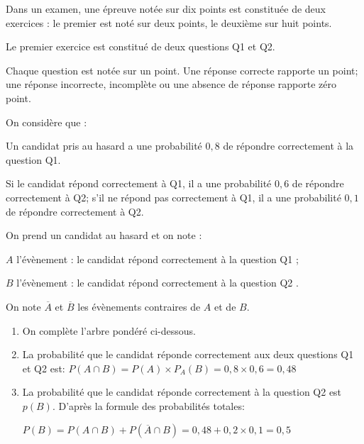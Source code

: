 
Dans un examen, une épreuve notée sur dix points est constituée de deux exercices : le premier est noté sur deux points, le deuxième sur huit points.


\medskip


\medskip




Le premier exercice est constitué de deux questions Q1 et Q2.

Chaque question est notée sur un point. Une réponse correcte rapporte un point; une réponse incorrecte, incomplète ou une absence de réponse rapporte zéro point.

\begin{list}{\textbullet}{On considère que :}
\item Un candidat pris au hasard a une probabilité $0,8$ de répondre correctement à la question Q1.
\item Si le candidat répond correctement à Q1, il a une probabilité $0,6$ de répondre correctement à Q2; s'il ne répond pas correctement à Q1, il a une probabilité $0,1$ de répondre correctement à Q2.
\end{list}

On prend un candidat au hasard et on note :

\begin{list}{\textbullet}{}
		\item $A$ l'évènement : \og{}le candidat répond correctement à la question Q1 \fg{} ;
		\item $B$ l'évènement : \og{}le candidat répond correctement à la question Q2 \fg{}.
	\end{list}

On note $\overline{A}$ et $\overline{B}$ les évènements contraires de $A$ et de $B$.

	\begin{enumerate}
		\item On complète l'arbre pondéré ci-dessous.

\begin{center}
{\bigskip
{}
\pstree[treemode=R,nodesepA=0pt]%
{\TR{}}
{
{
	}
	{
	}
}
}
\bigskip
\end{center}
		\item La probabilité que le candidat réponde correctement aux deux questions Q1 et Q2 est: $P(A\cap B) = P(A)\times P_{A}(B)= 0,8\times 0,6 = 0,48$
		\item La probabilité que le candidat réponde correctement à la question Q2 est $p(B)$. D'après la formule des probabilités totales:

$P(B) = P(A\cap B) + P \left (\overline{A}\cap B\right )=0,48+0,2\times 0,1=0,5$		

	\end{enumerate}


